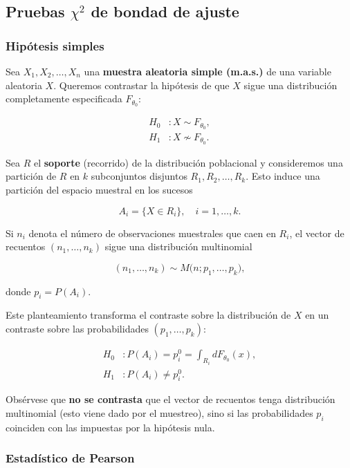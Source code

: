 \documentclass[
]{article}
\begin{document}
\subsection{\texorpdfstring{Pruebas \(\chi^2\) de bondad de ajuste}{Pruebas \textbackslash chi\^{}2 de bondad de ajuste}}\label{pruebas-chi2-de-bondad-de-ajuste}

\subsubsection{Hipótesis simples}\label{hipuxf3tesis-simples}

Sea \(X_1, X_2, \ldots, X_n\) una \textbf{muestra aleatoria simple (m.a.s.)} de una variable aleatoria \(X\). Queremos contrastar la hipótesis de que \(X\) sigue una distribución completamente especificada \(F_{\theta_0}\):

\[
\begin{aligned}
H_0 &: X \sim F_{\theta_0},\\
H_1 &: X \nsim F_{\theta_0}.
\end{aligned}
\]

Sea \(R\) el \textbf{soporte} (recorrido) de la distribución poblacional y consideremos una partición de \(R\) en \(k\) subconjuntos disjuntos \(R_1, R_2, \ldots, R_k\). Esto induce una partición del espacio muestral en los sucesos

\[
A_i = \{X \in R_i\}, \quad i=1,\ldots,k.
\]

Si \(n_i\) denota el número de observaciones muestrales que caen en \(R_i\), el vector de recuentos \((n_1, \ldots, n_k)\) sigue una distribución multinomial

\[
(n_1, \ldots, n_k) \sim M\bigl(n; p_1, \ldots, p_k\bigr),
\]

donde \(p_i = P(A_i)\).

Este planteamiento transforma el contraste sobre la distribución de \(X\) en un contraste sobre las probabilidades \((p_1, \ldots, p_k)\):

\[
\begin{aligned}
H_0 &: P(A_i) = p_i^0 = \int_{R_i} dF_{\theta_0}(x),\\
H_1 &: P(A_i) \neq p_i^0.
\end{aligned}
\]

Obsérvese que \textbf{no se contrasta} que el vector de recuentos tenga distribución multinomial (esto viene dado por el muestreo), sino si las probabilidades \(p_i\) coinciden con las impuestas por la hipótesis nula.

\subsubsection{Estadístico de Pearson}\label{estaduxedstico-de-pearson}
\end{document}
